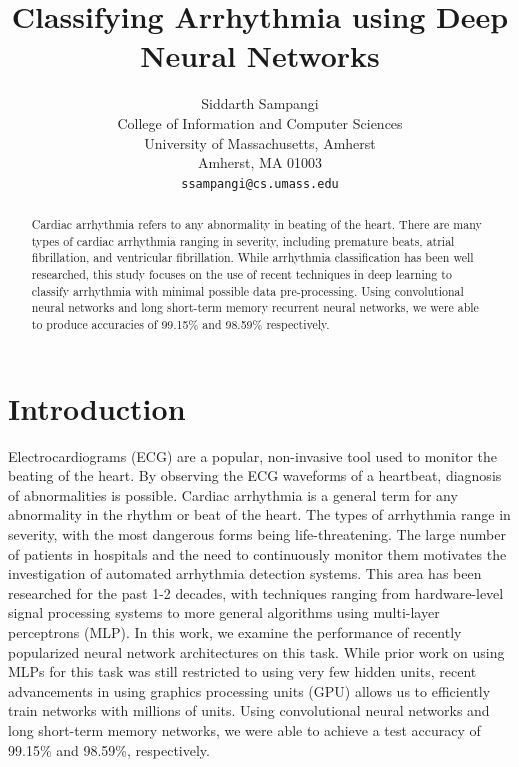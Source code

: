 \documentclass{article} %
\title{Classifying Arrhythmia using Deep Neural Networks}
\author{
Siddarth Sampangi \\
College of Information and Computer Sciences\\
University of Massachusetts, Amherst\\
Amherst, MA 01003 \\
\texttt{ssampangi@cs.umass.edu} \\
}
\begin{document}
\maketitle

\begin{abstract}
Cardiac arrhythmia refers to any abnormality in beating of the heart. There are many types of cardiac arrhythmia ranging in severity, including premature beats, atrial fibrillation, and ventricular fibrillation. While arrhythmia classification has been well researched, this study focuses on the use of recent techniques in deep learning to classify arrhythmia with minimal possible data pre-processing. Using convolutional neural networks and long short-term memory recurrent neural networks, we were able to produce accuracies of 99.15\% and 98.59\% respectively.

\end{abstract}

\section{Introduction}
Electrocardiograms (ECG) are a popular, non-invasive tool used to monitor the beating of the heart. By observing the ECG waveforms of a heartbeat, diagnosis of abnormalities is possible. Cardiac arrhythmia is a general term for any abnormality in the rhythm or beat of the heart. The types of arrhythmia range in severity, with the most dangerous forms being life-threatening. The large number of patients in hospitals and the need to continuously monitor them motivates the investigation of automated arrhythmia detection systems. This area has been researched for the past 1-2 decades, with techniques ranging from hardware-level signal processing systems to more general algorithms using multi-layer perceptrons (MLP). In this work, we examine the performance of recently popularized neural network architectures on this task. While prior work on using MLPs for this task was still restricted to using very few hidden units, recent advancements in using graphics processing units (GPU) allows us to efficiently train networks with millions of units. Using convolutional neural networks and long short-term memory networks, we were able to achieve a test accuracy of 99.15\% and 98.59\%, respectively.
\end{document}
